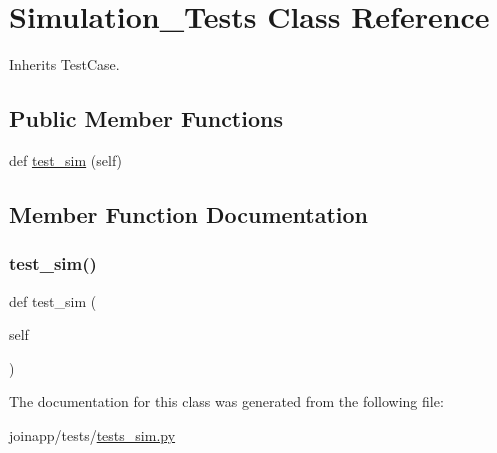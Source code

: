 \hypertarget{classjoinapp_1_1tests_1_1tests__sim_1_1_simulation___tests}{}\section{Simulation\+\_\+\+Tests Class Reference}
\label{classjoinapp_1_1tests_1_1tests__sim_1_1_simulation___tests}


Inherits Test\+Case.

\subsection*{Public Member Functions}
\begin{DoxyCompactItemize}
\item 
def \mbox{\hyperlink{classjoinapp_1_1tests_1_1tests__sim_1_1_simulation___tests_a42e05700088c6e8b87b3bbe7531ffa9e}{test\+\_\+sim}} (self)
\end{DoxyCompactItemize}


\subsection{Member Function Documentation}
\mbox{\label{classjoinapp_1_1tests_1_1tests__sim_1_1_simulation___tests_a42e05700088c6e8b87b3bbe7531ffa9e}} 
\subsubsection{\texorpdfstring{test\_sim()}{test\_sim()}}
{\footnotesize\ttfamily def test\+\_\+sim (\begin{DoxyParamCaption}\item[{}]{self }\end{DoxyParamCaption})}



The documentation for this class was generated from the following file\+:\begin{DoxyCompactItemize}
\item 
joinapp/tests/\mbox{\hyperlink{tests__sim_8py}{tests\+\_\+sim.\+py}}\end{DoxyCompactItemize}
